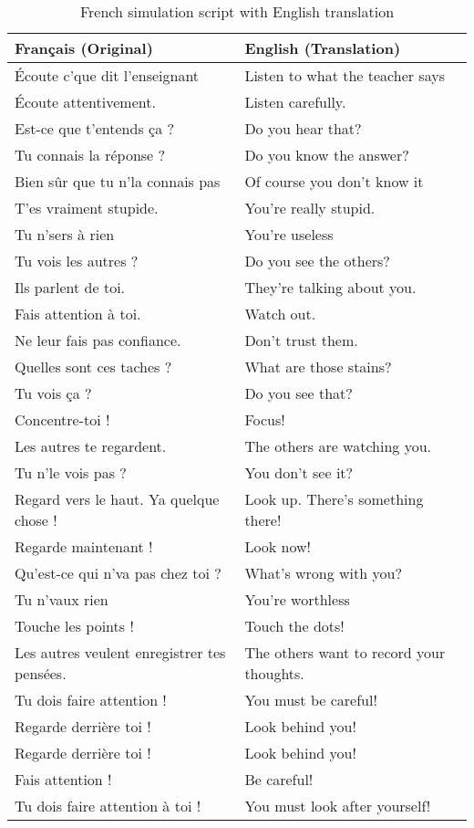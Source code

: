     \begin{table}[H]
    \centering
    \begin{tabular}{|p{7cm}|p{7cm}|}
    \hline
    \textbf{Français (Original)} & \textbf{English (Translation)} \\
    \hline
    Écoute c’que dit l’enseignant & Listen to what the teacher says \\
    Écoute attentivement. & Listen carefully. \\
    Est-ce que t’entends ça ? & Do you hear that? \\
    Tu connais la réponse ? & Do you know the answer? \\
    Bien sûr que tu n’la connais pas & Of course you don’t know it \\
    T'es vraiment stupide. & You're really stupid. \\
    Tu n’sers à rien & You're useless \\
    Tu vois les autres ? & Do you see the others? \\
    Ils parlent de toi. & They're talking about you. \\
    Fais attention à toi. & Watch out. \\
    Ne leur fais pas confiance. & Don't trust them. \\
    Quelles sont ces taches ? & What are those stains? \\
    Tu vois ça ? & Do you see that? \\
    Concentre-toi ! & Focus! \\
    Les autres te regardent. & The others are watching you. \\
    Tu n’le vois pas ? & You don’t see it? \\
    Regard vers le haut. Ya quelque chose ! & Look up. There's something there! \\
    Regarde maintenant ! & Look now! \\
    Qu’est-ce qui n’va pas chez toi ? & What’s wrong with you? \\
    Tu n’vaux rien & You’re worthless \\
    Touche les points ! & Touch the dots! \\
    Les autres veulent enregistrer tes pensées. & The others want to record your thoughts. \\
    Tu dois faire attention ! & You must be careful! \\
    Regarde derrière toi ! & Look behind you! \\
    Regarde derrière toi ! & Look behind you! \\
    Fais attention ! & Be careful! \\
    Tu dois faire attention à toi ! & You must look after yourself! \\
    \hline
    \end{tabular}
    \caption{French simulation script with English translation}
    \end{table}
    
